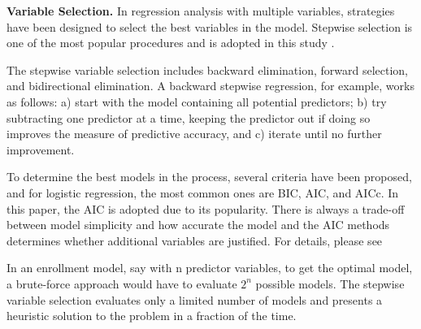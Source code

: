 \documentclass[12pt,english]{report}
\begin{document}
\vspace{0.15in}
\noindent \textbf{Variable Selection. }  In regression analysis with multiple variables, strategies have been designed to select the best variables in the model. Stepwise selection is one of the most popular procedures and is adopted in this study \citep{konishi2008information}.

The stepwise variable selection includes backward elimination, forward selection, and bidirectional elimination. A backward stepwise regression, for example, works as follows: a) start with the model containing all potential predictors; b) try subtracting one predictor at a time, keeping the predictor out if doing so improves the measure of predictive accuracy, and c) iterate until no further improvement. 


To determine the best models in the process, several criteria have been proposed, and for logistic regression, the most common ones are BIC, AIC, and AICc. In this paper, the AIC is adopted due to its popularity.  There is always a trade-off between model simplicity and how accurate the model and the AIC methods determines whether additional variables are justified. For details, please see \citep{wagenmakers2004aic}
     
In an enrollment model, say with n predictor variables, to get the optimal model, a brute-force approach would have to evaluate $2^{n}$ possible models. The stepwise variable selection evaluates only a limited number of models and presents a heuristic solution to the problem in a fraction of the time.  
\end{document}
